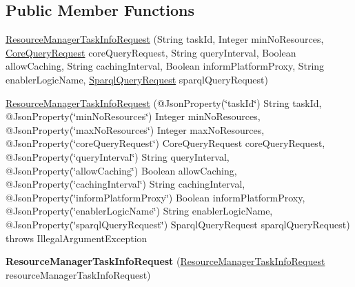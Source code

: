 \subsection*{Public Member Functions}
\begin{DoxyCompactItemize}
\item 
\hyperlink{classeu_1_1h2020_1_1symbiote_1_1enabler_1_1messaging_1_1model_1_1ResourceManagerTaskInfoRequest_a0885ab523242d4d2b30a64acf694ce76}{Resource\+Manager\+Task\+Info\+Request} (String task\+Id, Integer min\+No\+Resources, \hyperlink{classeu_1_1h2020_1_1symbiote_1_1core_1_1internal_1_1CoreQueryRequest}{Core\+Query\+Request} core\+Query\+Request, String query\+Interval, Boolean allow\+Caching, String caching\+Interval, Boolean inform\+Platform\+Proxy, String enabler\+Logic\+Name, \hyperlink{classeu_1_1h2020_1_1symbiote_1_1core_1_1ci_1_1SparqlQueryRequest}{Sparql\+Query\+Request} sparql\+Query\+Request)
\item 
\hyperlink{classeu_1_1h2020_1_1symbiote_1_1enabler_1_1messaging_1_1model_1_1ResourceManagerTaskInfoRequest_a3bd1231a66e1eb71e0bc8d44ea478905}{Resource\+Manager\+Task\+Info\+Request} (@Json\+Property(\char`\"{}task\+Id\char`\"{}) String task\+Id, @Json\+Property(\char`\"{}min\+No\+Resources\char`\"{}) Integer min\+No\+Resources, @Json\+Property(\char`\"{}max\+No\+Resources\char`\"{}) Integer max\+No\+Resources, @Json\+Property(\char`\"{}core\+Query\+Request\char`\"{}) Core\+Query\+Request core\+Query\+Request, @Json\+Property(\char`\"{}query\+Interval\char`\"{}) String query\+Interval, @Json\+Property(\char`\"{}allow\+Caching\char`\"{}) Boolean allow\+Caching, @Json\+Property(\char`\"{}caching\+Interval\char`\"{}) String caching\+Interval, @Json\+Property(\char`\"{}inform\+Platform\+Proxy\char`\"{}) Boolean inform\+Platform\+Proxy, @Json\+Property(\char`\"{}enabler\+Logic\+Name\char`\"{}) String enabler\+Logic\+Name, @Json\+Property(\char`\"{}sparql\+Query\+Request\char`\"{}) Sparql\+Query\+Request sparql\+Query\+Request)  throws Illegal\+Argument\+Exception 
\item 
\mbox{\label{classeu_1_1h2020_1_1symbiote_1_1enabler_1_1messaging_1_1model_1_1ResourceManagerTaskInfoRequest_a58df014a62cd4e6df944f0f104a0319a}} 
{\bfseries Resource\+Manager\+Task\+Info\+Request} (\hyperlink{classeu_1_1h2020_1_1symbiote_1_1enabler_1_1messaging_1_1model_1_1ResourceManagerTaskInfoRequest}{Resource\+Manager\+Task\+Info\+Request} resource\+Manager\+Task\+Info\+Request)

\end{DoxyCompactItemize}
